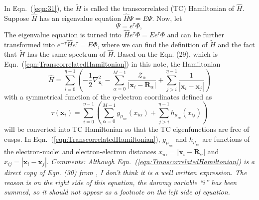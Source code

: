 In Eqn.~(\ref{eqn:31}), the $\tilde{H}$ is called the transcorrelated (TC) Hamiltonian of $\hat{H}$. Suppose $\hat{H}$ has an eigenvalue equation $\hat{H}\Psi=E\Psi$. Now, let
\begin{equation}
    \Psi=e^{\tau}\Phi,
\end{equation}
The eigenvalue equation is turned into $\hat{H}e^{\tau}\Phi=Ee^{\tau}\Phi$ and can be further transformed into $e^{-\tau}\hat{H}e^{\tau}=E\Phi$, where we can find the definition of $\tilde{H}$ and the fact that $\tilde{H}$ has the same spectrum of $\hat{H}$.
 Based on the Eqn. (29), which is Eqn.~(\ref{eqn:TranscorrelatedHamiltonian}) in this note, the Hamiltonian
\begin{equation}
    \hat{H}=\sum_{i=0}^{\eta-1}\left(-\frac{1}{2}\nabla_{\textbf{x}_i}^2-\sum_{\alpha=0}^{M-1}\frac{\mathcal{Z}_{\alpha}}{|\textbf{x}_i-\textbf{R}_{\alpha}|}+\sum_{j>i}^{\eta-1}\frac{1}{|\textbf{x}_i-\textbf{x}_j|}\right)
    \label{eqn:HamiltonianBeforeDescritization}
\end{equation}
with a symmetrical function of the $\eta$-electron coordinates defined as
\begin{equation}
    \tau({\textbf{x}_i})=\sum_{i=0}^{\eta-1}\left(\sum_{\alpha=0}^{M-1}g_{\mu_{ne}}(x_{i\alpha})+\sum_{j>i}^{\eta-1}h_{\mu_{ee}}(x_{ij})\right)
    \label{eqn:TranscorrelatedHamiltonian}
\end{equation}
will be converted into TC Hamiltonian so that the TC eigenfunctions are free of cusps. In Eqn.~(\ref{eqn:TranscorrelatedHamiltonian}), $g_{\mu_{ne}}$ and $h_{\mu_{ee}}$ are functions of the electron-nuclei and electron-electron distances $x_{i\alpha}=| \textbf{x}_i-\textbf{R}_{\alpha} |$ and $x_{ij}=| \textbf{x}_i-\textbf{x}_j|$. \textit{Comments: Although Eqn.~(\ref{eqn:TranscorrelatedHamiltonian}) is a direct copy of Eqn. (30) from \cite{feniou2025realspacechemistryquantumcomputers}, I don't think it is a well written expression. The reason is on the right side of this equation, the dummy variable ``$i$'' has been summed, so it should not appear as a footnote on the left side of equation.} 
